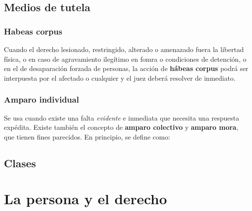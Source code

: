 \documentclass[../main.tex]{subfiles}
\begin{document}
\subsection{Medios de tutela}

\subsubsection{Habeas corpus}

Cuando el derecho lesionado, restringido, alterado o amenazado fuera la libertad 
física, o en caso de agravamiento ilegítimo en fomra o condiciones de detención,
o en el de desaparación forzada de personas, la acción de \textbf{hábeas corpus} 
podrá ser interpuesta por el afectado o cualquier y el juez deberá resolver de 
inmediato.

\subsubsection{Amparo individual}

Se usa cuando existe una falta \textit{evidente} e inmediata que necesita una 
respuesta expédita. Existe también el concepto de \textbf{amparo colectivo} y
\textbf{amparo mora}, que tienen fines parecidos. En principio, se define como:

\space{0.3cm}
\begin{center}
\end{center}
\vspace{0.3cm}

\subsection{Clases}


\section{La persona y el derecho}
\end{document}
